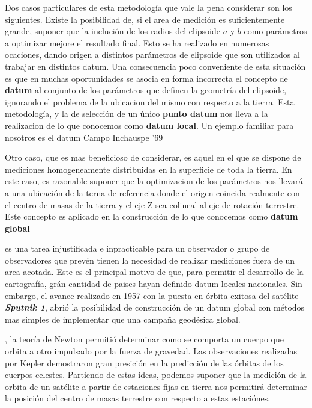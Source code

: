 \documentclass{tufte-book}
\begin{document}
Dos casos particulares de esta metodología que vale la pena considerar son los siguientes. Existe la posibilidad de,
si el area de medición es suficientemente grande, suponer que la inclución de los radios del elipsoide \(a\) y \(b\)
como parámetros a optimizar mejore el resultado final. Esto se ha realizado en numerosas ocaciones, dando origen a
distintos parámetros de elipsoide que son utilizados al trabajar en distintos datum. Una consecuencia poco conveniente
de esta situación es que en muchas oportunidades se asocia en forma incorrecta el concepto de \textbf{datum} al conjunto
de los parámetros que definen la geometría del elipsoide, ignorando el problema de la ubicacion del mismo con respecto
a la tierra. Esta metodología, y la de selección de un único \textbf{punto datum} nos lleva a la realizacion de lo que
conocemos como \textbf{datum local}. Un ejemplo familiar para nosotros es el datum Campo Inchauspe '69

Otro caso, que es mas beneficioso de considerar, es aquel en el que se dispone de mediciones homogeneamente
distribuidas en la superficie de toda la tierra.
En este caso, es razonable suponer que la optimizacion de los parámetros nos llevará a una ubicación de la terna de
referencia donde el origen coincida realmente con el centro de masas de la tierra y el eje Z sea colineal al eje de
rotación terrestre. Este concepto es aplicado en la construcción de lo que conocemos como \textbf{datum global}

 es una tarea injustificada
e inpracticable para un observador o grupo de observadores que prevén tienen la necesidad de realizar mediciones
fuera de un area acotada. Este es el principal motivo de que, para permitir el desarrollo de la cartografía,
grán cantidad de paises hayan definido datum locales nacionales. Sin embargo, el avance realizado en 1957 con
la puesta en órbita exitosa del satélite \textbf{\textit{Sputnik 1}}, abrió la posibilidad de construcción de un
datum global con métodos mas simples de implementar que una campaña geodésica global.

, la teoría de Newton permitió determinar como se comporta un cuerpo
que orbita a otro impulsado por la fuerza de gravedad. Las observaciones realizadas por Kepler demostraron gran presición
en la predicción de las órbitas de los cuerpos celestes. Partiendo de estas ideas, podemos suponer que la medición de
la orbita de un satélite a partir de estaciones fijas en tierra nos permitirá determinar la posición del centro de masas
terrestre con respecto a estas estaciónes.
\end{document}
